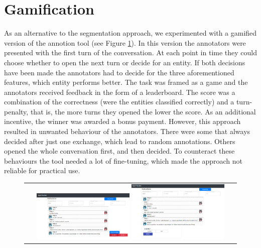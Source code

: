 \documentclass[11pt,a4paper]{article}
\begin{document}
\section{Gamification}
\label{sec:appendix_gamification}
As an alternative to the segmentation approach, we experimented with a gamified version of the annotion tool (see Figure \ref{fig:game-tool}). In this version the annotators were presented with the first turn of the conversation. At each point in time they could choose whether to open the next turn or decide for an entity. If both decisions have been made the annotators had to decide for the three aforementioned features, which entity performs better. 
The task was framed as a game and the annotators received feedback in the form of a leaderboard. The score was a combination of the correctness (were the entities classified correctly) and a turn-penalty, that is, the more turns they opened the lower the score. As an additional incentive, the winner was awarded a bonus payment. 
However, this approach resulted in unwanted behaviour of the annotators. There were some that always decided after just one exchange, which lead to random annotations. Others opened the whole conversation first, and then decided. To counteract these behaviours the tool needed a lot of fine-tuning, which made the approach not reliable for practical use.


\label{sec:appendix}
\begin{figure}[!ht]
	\begin{center}
        \begin{tabular}{@{}c@{}}
		\includegraphics[width=0.45\textwidth]{figures/GameAnnotationTool1.png} 
		\includegraphics[width=0.45\textwidth]{figures/GameAnnotationTool2.png}
       \end{tabular}
	\end{center}\vspace{-3mm}
\label{fig:game-tool}
\end{figure}
\end{document}
